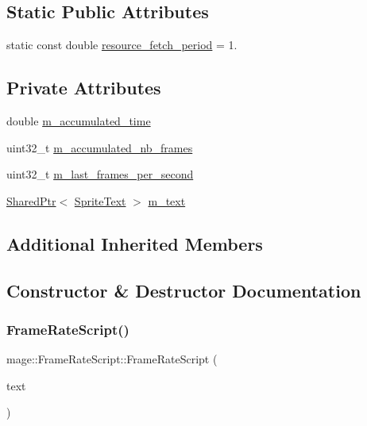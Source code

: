 \subsection*{Static Public Attributes}
\begin{DoxyCompactItemize}
\item 
static const double \hyperlink{classmage_1_1_frame_rate_script_a34e734aedfe92891d87e5419ff60f4f2}{resource\+\_\+fetch\+\_\+period} = 1.
\end{DoxyCompactItemize}
\subsection*{Private Attributes}
\begin{DoxyCompactItemize}
\item 
double \hyperlink{classmage_1_1_frame_rate_script_ad2811547f84f1c62392e36fd8b82042d}{m\+\_\+accumulated\+\_\+time}
\item 
uint32\+\_\+t \hyperlink{classmage_1_1_frame_rate_script_a96dc980d017ad5e1b1f00db2526cd576}{m\+\_\+accumulated\+\_\+nb\+\_\+frames}
\item 
uint32\+\_\+t \hyperlink{classmage_1_1_frame_rate_script_a6126772a3b500a0c044837f432d10976}{m\+\_\+last\+\_\+frames\+\_\+per\+\_\+second}
\item 
\hyperlink{namespacemage_a1e01ae66713838a7a67d30e44c67703e}{Shared\+Ptr}$<$ \hyperlink{classmage_1_1_sprite_text}{Sprite\+Text} $>$ \hyperlink{classmage_1_1_frame_rate_script_a7d55db21f500e92914293cd6850e3b53}{m\+\_\+text}
\end{DoxyCompactItemize}
\subsection*{Additional Inherited Members}


\subsection{Constructor \& Destructor Documentation}
\hypertarget{classmage_1_1_frame_rate_script_a8ef13ffd08a684cbc2010b0e4594d4cf}{}\label{classmage_1_1_frame_rate_script_a8ef13ffd08a684cbc2010b0e4594d4cf} 
\subsubsection{\texorpdfstring{Frame\+Rate\+Script()}{FrameRateScript()}\hspace{0.1cm}{\footnotesize\ttfamily [1/3]}}
{\footnotesize\ttfamily mage\+::\+Frame\+Rate\+Script\+::\+Frame\+Rate\+Script (\begin{DoxyParamCaption}\item[{\hyperlink{namespacemage_a1e01ae66713838a7a67d30e44c67703e}{Shared\+Ptr}$<$ \hyperlink{classmage_1_1_sprite_text}{Sprite\+Text} $>$}]{text }\end{DoxyParamCaption})\hspace{0.3cm}{\ttfamily [explicit]}}

